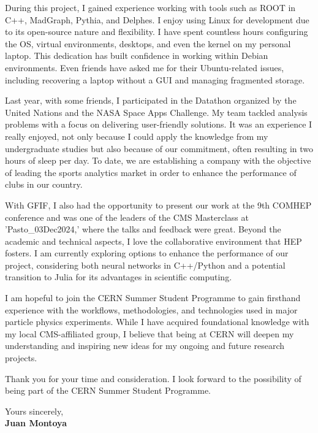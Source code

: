 \documentclass[11pt]{report}
\begin{document}
\begin{titlepage}
During this project, I gained experience working with tools such as ROOT in C++, MadGraph, Pythia, and Delphes. I enjoy using Linux for development due to its open-source nature and flexibility. I have spent countless hours configuring the OS, virtual environments, desktops, and even the kernel on my personal laptop. This dedication has built confidence in working within Debian environments. Even friends have asked me for their Ubuntu-related issues, including recovering a laptop without a GUI and managing fragmented storage.

\vspace{0.7em}

Last year, with some friends, I participated in the Datathon organized by the United Nations and the NASA Space Apps Challenge. My team tackled analysis problems with a focus on delivering user-friendly solutions. It was an experience I really enjoyed, not only because I could apply the knowledge from my undergraduate studies but also because of our commitment, often resulting in two hours of sleep per day. To date, we are establishing a company with the objective of leading the sports analytics market in order to enhance the performance of clubs in our country.

\vspace{0.7em}

With GFIF, I also had the opportunity to present our work at the 9th COMHEP conference and was one of the leaders of the CMS Masterclass at 'Pasto\_03Dec2024,' where the talks and feedback were great. Beyond the academic and technical aspects, I love the collaborative environment that HEP fosters. I am currently exploring options to enhance the performance of our project, considering both neural networks in C++/Python and a potential transition to Julia for its advantages in scientific computing.

\vspace{0.7em}

I am hopeful to join the CERN Summer Student Programme to gain firsthand experience with the workflows, methodologies, and technologies used in major particle physics experiments. While I have acquired foundational knowledge with my local CMS-affiliated group, I believe that being at CERN will deepen my understanding and inspiring new ideas for my ongoing and future research projects.

\vspace{0.7em}

Thank you for your time and consideration. I look forward to the possibility of being part of the CERN Summer Student Programme.

\vspace{0.7em}


\raggedright Yours sincerely,\\
\textbf{Juan Montoya}

\end{titlepage}
\end{document}
